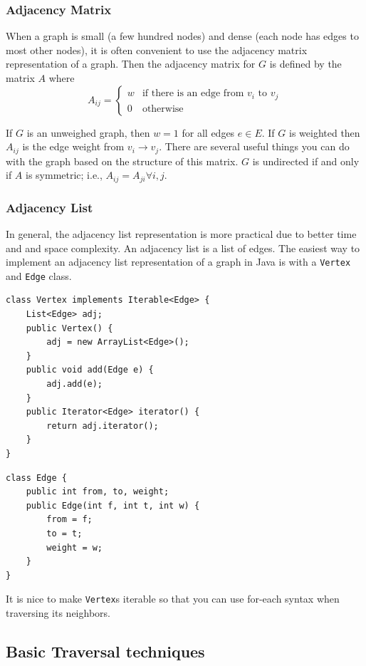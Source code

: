 \documentclass[a4paper,12pt]{article}
\begin{document}
\subsubsection{Adjacency Matrix}

When a graph is small (a few hundred nodes) and dense (each node has edges to most other nodes), it is often convenient to use the adjacency matrix representation of a graph. Then the adjacency matrix for $G$ is defined by the matrix $A$ where 
\[
A_{ij} = \begin{cases}
w & \text{if there is an edge from $v_i$ to $v_j$} \\
0 & \text{otherwise}
\end{cases}
\]

If $G$ is an unweighed graph, then $w = 1$ for all edges $e \in E$. If $G$ is weighted then $A_{ij}$ is the edge weight from $v_i \to v_j$. There are several useful things you can do with the graph based on the structure of this matrix. $G$ is undirected if and only if $A$ is symmetric; i.e., $A_{ij} = A_{ji} \forall i,j$.

\subsubsection{Adjacency List}

In general, the adjacency list representation is more practical due to better time and and space complexity. An adjacency list is a list of edges. The easiest way to implement an adjacency list representation of a graph in Java is with a \lstinline/Vertex/ and \lstinline/Edge/ class.

\begin{lstlisting}
class Vertex implements Iterable<Edge> {
	List<Edge> adj;
	public Vertex() {
		adj = new ArrayList<Edge>();
	}
	public void add(Edge e) {
		adj.add(e);
	}
	public Iterator<Edge> iterator() {
		return adj.iterator();
	}
}
\end{lstlisting}

\begin{lstlisting}
class Edge {
	public int from, to, weight;
	public Edge(int f, int t, int w) {
		from = f;
		to = t;
		weight = w;
	}
}
\end{lstlisting}

It is nice to make \lstinline/Vertex/s iterable so that you can use for-each syntax when traversing its neighbors. 

\subsection{Basic Traversal techniques}
\end{document}
